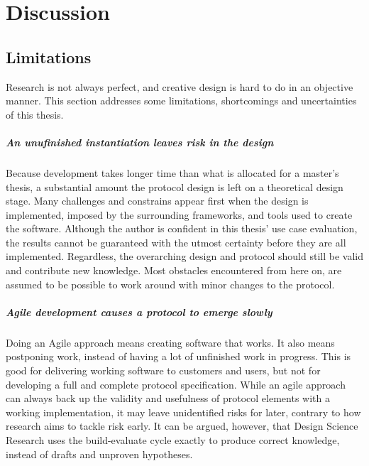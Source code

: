 \chapter{Discussion}\label{chap:discussion}




\section{Limitations}

Research is not always perfect, and creative design is hard to do in an objective manner.
This section addresses some limitations, shortcomings and uncertainties of this thesis.

\paragraph{An unufinished instantiation leaves risk in the design}
Because development takes longer time than what is allocated for a master's thesis, a substantial amount the protocol design is left on a theoretical design stage.
Many challenges and constrains appear first when the design is implemented, imposed by the surrounding frameworks,  and tools used to create the software.
Although the author is confident in this thesis' use case evaluation, the results cannot be guaranteed with the utmost certainty before they are all implemented.
Regardless, the overarching design and protocol should still be valid and contribute new knowledge.
Most obstacles encountered from here on, are assumed to be possible to work around with minor changes to the protocol.

\paragraph{Agile development causes a protocol to emerge slowly}
Doing an Agile approach means creating software that works.
It also means postponing work, instead of having a lot of unfinished work in progress.
This is good for delivering working software to customers and users, but not for developing a full and complete protocol specification.
While an agile approach can always back up the validity and usefulness of protocol elements with a working implementation, it may leave unidentified risks for later, contrary to how research aims to tackle risk early.
It can be argued, however, that Design Science Research uses the build-evaluate cycle exactly to produce correct knowledge, instead of drafts and unproven hypotheses.


